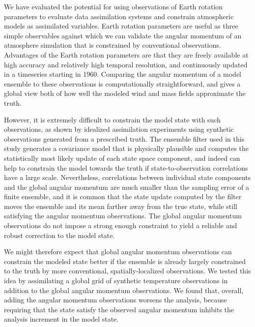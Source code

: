 We have evaluated the potential for using observations of Earth rotation parameters to evaluate data assimilation systems and constrain atmospheric models as assimilated variables.  
%
Earth rotation parameters are useful as three simple observables against which we can validate the angular momentum of an atmosphere simulation that is constrained by conventional observations.  
Advantages of the Earth rotation parameters are that they are freely available \citep{iers} at high accuracy and relatively high temporal resolution, and continuously updated in a timeseries starting in 1960. 
Comparing the angular momentum of a model ensemble to these observations is computationally straightforward, and 
gives a global view both of how well the modeled wind and mass fields approximate the truth.

However, it is extremely difficult to constrain the model state with such observations, as shown by 
idealized assimilation experiments using synthetic observations generated from a prescribed truth.
The ensemble filter used in this study generates a covariance model that is physically plausible and computes the statistically most likely update of each state space component, and indeed can help to constrain the model towards the truth if state-to-observation correlations have a large scale. 
Nevertheless, correlations between individual state components and the global angular momentum are much smaller than the sampling error of a finite ensemble, and it is common that 
the state update computed by the filter moves the ensemble and its mean farther away from the true state, while still satisfying the angular momentum observations. 
The global angular momentum observations do not impose a strong enough constraint to yield a reliable and robust correction to the model state. 

We might therefore expect that global angular momentum observations can constrain the modeled state better if the ensemble is already largely constrained to the truth by more conventional, spatially-localized observations. 
We tested this idea by assimilating a global grid of synthetic temperature observations in addition to the global angular momentum observations. 
We found that, overall, adding the angular momentum observations worsens the analysis, 
because requiring that the state satisfy the observed angular momentum inhibits the analysis increment in the model state.  

